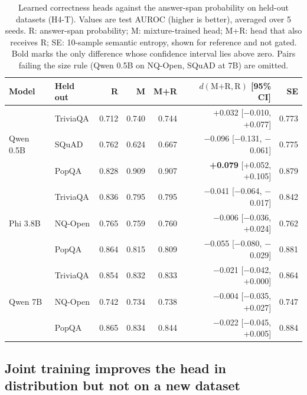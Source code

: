 \documentclass[10pt]{article}
\begin{document}
\begin{table}[t]
\centering
\small
\begin{tabular}{@{}llrrrrr@{}}
\toprule
Model & Held out & R & M & M+R & $d(\text{M+R}, \text{R})$ [95\% CI] & SE \\
\midrule
\multirow{3}{*}{Qwen 0.5B} & TriviaQA & 0.712 & 0.740 & 0.744 & +0.032 [$-$0.010, +0.077] & 0.773 \\
 & SQuAD & 0.762 & 0.624 & 0.667 & $-$0.096 [$-$0.131, $-$0.061] & 0.775 \\
 & PopQA & 0.828 & 0.909 & 0.907 & \textbf{+0.079} [+0.052, +0.105] & 0.879 \\
\midrule
\multirow{3}{*}{Phi 3.8B} & TriviaQA & 0.836 & 0.795 & 0.795 & $-$0.041 [$-$0.064, $-$0.017] & 0.842 \\
 & NQ-Open & 0.765 & 0.759 & 0.760 & $-$0.006 [$-$0.036, +0.024] & 0.762 \\
 & PopQA & 0.864 & 0.815 & 0.809 & $-$0.055 [$-$0.080, $-$0.029] & 0.881 \\
\midrule
\multirow{3}{*}{Qwen 7B} & TriviaQA & 0.854 & 0.832 & 0.833 & $-$0.021 [$-$0.042, +0.000] & 0.864 \\
 & NQ-Open & 0.742 & 0.734 & 0.738 & $-$0.004 [$-$0.035, +0.027] & 0.747 \\
 & PopQA & 0.865 & 0.834 & 0.844 & $-$0.022 [$-$0.045, +0.005] & 0.884 \\
\bottomrule
\end{tabular}
\caption{Learned correctness heads against the answer-span probability on held-out datasets (H4-T). Values are test AUROC (higher is better), averaged over 5 seeds. R: answer-span probability; M: mixture-trained head; M+R: head that also receives R; SE: 10-sample semantic entropy, shown for reference and not gated. Bold marks the only difference whose confidence interval lies above zero. Pairs failing the size rule (Qwen 0.5B on NQ-Open, SQuAD at 7B) are omitted.}
\label{tab:h4t}
\end{table}

\subsection{Joint training improves the head in distribution but not on a new dataset}
\label{sec:joint}
\end{document}
